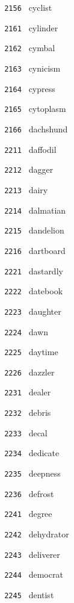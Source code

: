 \documentclass[11pt]{article}
\begin{document}
\begin{multicols}{6}
\noindent \texttt{ 2156 } cyclist  \par
\vspace{3mm}
\noindent \texttt{ 2161 } cylinder  \par
\noindent \texttt{ 2162 } cymbal  \par
\noindent \texttt{ 2163 } cynicism  \par
\noindent \texttt{ 2164 } cypress  \par
\noindent \texttt{ 2165 } cytoplasm  \par
\noindent \texttt{ 2166 } dachshund  \par
\noindent \texttt{ 2211 } daffodil  \par
\noindent \texttt{ 2212 } dagger  \par
\noindent \texttt{ 2213 } dairy  \par
\noindent \texttt{ 2214 } dalmatian  \par
\noindent \texttt{ 2215 } dandelion  \par
\noindent \texttt{ 2216 } dartboard  \par
\vspace{3mm}
\noindent \texttt{ 2221 } dastardly  \par
\noindent \texttt{ 2222 } datebook  \par
\noindent \texttt{ 2223 } daughter  \par
\noindent \texttt{ 2224 } dawn  \par
\noindent \texttt{ 2225 } daytime  \par
\noindent \texttt{ 2226 } dazzler  \par
\vspace{3mm}
\noindent \texttt{ 2231 } dealer  \par
\noindent \texttt{ 2232 } debris  \par
\noindent \texttt{ 2233 } decal  \par
\noindent \texttt{ 2234 } dedicate  \par
\noindent \texttt{ 2235 } deepness  \par
\noindent \texttt{ 2236 } defrost  \par
\vspace{3mm}
\noindent \texttt{ 2241 } degree  \par
\noindent \texttt{ 2242 } dehydrator  \par
\noindent \texttt{ 2243 } deliverer  \par
\noindent \texttt{ 2244 } democrat  \par
\noindent \texttt{ 2245 } dentist  \par

\end{multicols}
\end{document}
